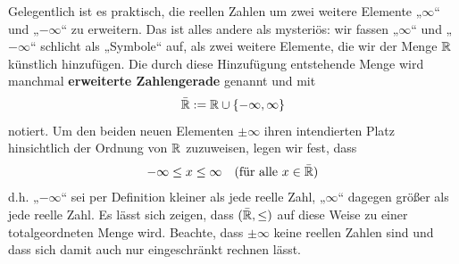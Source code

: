 \begin{defin} 
    Gelegentlich ist es praktisch, die reellen Zahlen um zwei weitere Elemente „$\infty$“ und „$-\infty$“ zu erweitern. Das ist alles andere als mysteriös: wir fassen „$\infty$“ und „$-\infty$“ schlicht als „Symbole“ auf, als zwei weitere Elemente, die wir der Menge $\mathbb R$ künstlich hinzufügen. Die durch diese Hinzufügung entstehende Menge wird manchmal \textbf{erweiterte Zahlengerade} genannt und mit
        \[ \bar{\mathbb R} := \mathbb R\cup \{-\infty,\infty\} \]
    notiert. Um den beiden neuen Elementen $\pm \infty$ ihren intendierten Platz hinsichtlich der Ordnung von $\mathbb R$ zuzuweisen, legen wir fest, dass
        \begin{align*}
            -\infty \le  x \le \infty && (\text{für alle $x\in \bar {\mathbb R}$})
        \end{align*}
    d.h. „$-\infty$“ sei per Definition kleiner als jede reelle Zahl, „$\infty$“ dagegen größer als jede reelle Zahl. Es lässt sich zeigen, dass $(\bar {\mathbb R},\le)$ auf diese Weise zu einer totalgeordneten Menge wird. Beachte, dass $\pm \infty$ keine reellen Zahlen sind und dass sich damit auch nur eingeschränkt rechnen lässt.
\end{defin}


